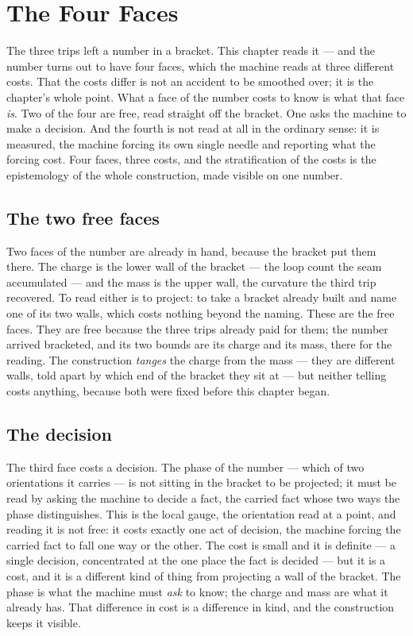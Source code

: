 \chapter{The Four Faces}
\label{chap:the-four-faces}

The three trips left a number in a bracket. This chapter reads it --- and the number turns out to have four
faces, which the machine reads at three different costs. That the costs differ is not an accident to be
smoothed over; it is the chapter's whole point. What a face of the number costs to know is what that face
\emph{is}. Two of the four are free, read straight off the bracket. One asks the machine to make a decision.
And the fourth is not read at all in the ordinary sense: it is measured, the machine forcing its own single
needle and reporting what the forcing cost. Four faces, three costs, and the stratification of the costs is
the epistemology of the whole construction, made visible on one number.

\section{The two free faces}
\label{se:two-free-faces}

Two faces of the number are already in hand, because the bracket put them there. The charge is the lower
wall of the bracket --- the loop count the seam accumulated --- and the mass is the upper wall, the
curvature the third trip recovered. To read either is to project: to take a bracket already built and name
one of its two walls, which costs nothing beyond the naming. These are the free faces. They are free because
the three trips already paid for them; the number arrived bracketed, and its two bounds are its charge and
its mass, there for the reading. The construction \emph{tanges} the charge from the mass --- they are
different walls, told apart by which end of the bracket they sit at --- but neither telling costs anything,
because both were fixed before this chapter began.

\section{The decision}
\label{se:the-decision}

The third face costs a decision. The phase of the number --- which of two orientations it carries --- is not
sitting in the bracket to be projected; it must be read by asking the machine to decide a fact, the carried
fact whose two ways the phase distinguishes. This is the local gauge, the orientation read at a point, and
reading it is not free: it costs exactly one act of decision, the machine forcing the carried fact to fall
one way or the other. The cost is small and it is definite --- a single decision, concentrated at the one
place the fact is decided --- but it is a cost, and it is a different kind of thing from projecting a wall of
the bracket. The phase is what the machine must \emph{ask} to know; the charge and mass are what it already
has. That difference in cost is a difference in kind, and the construction keeps it visible.

